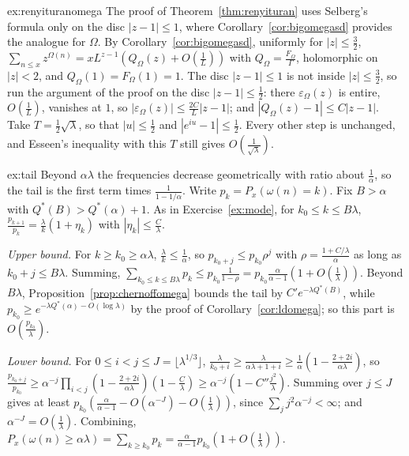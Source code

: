 \begin{solution}{ex:renyituranomega}
\idea The proof of Theorem~\ref{thm:renyituran} uses Selberg's formula only on the disc $|z-1|\le1$, where Corollary~\ref{cor:bigomegasd} provides the analogue for $\Omega$.
\writeup By Corollary~\ref{cor:bigomegasd}, uniformly for $|z|\le\frac32$, $\sum_{n\le x}z^{\Omega(n)}=xL^{z-1}(Q_\Omega(z)+O(\frac1L))$ with $Q_\Omega=\frac{F_\Omega}\Gamma$, holomorphic on $|z|<2$, and $Q_\Omega(1)=F_\Omega(1)=1$. The disc $|z-1|\le1$ is not inside $|z|\le\frac32$, so run the argument of the proof on the disc $|z-1|\le\frac12$: there $\varepsilon_\Omega(z)$ is entire, $O(\frac1L)$, vanishes at $1$, so $|\varepsilon_\Omega(z)|\le\frac{2C}L|z-1|$; and $|Q_\Omega(z)-1|\le C|z-1|$. Take $T=\frac12\sqrt\lambda$, so that $|u|\le\frac12$ and $|e^{iu}-1|\le\frac12$. Every other step is unchanged, and Esseen's inequality with this $T$ still gives $O(\frac1{\sqrt\lambda})$.
\end{solution}

\begin{solution}{ex:tail}
\idea Beyond $\alpha\lambda$ the frequencies decrease geometrically with ratio about $\frac1\alpha$, so the tail is the first term times $\frac1{1-1/\alpha}$.
\writeup Write $p_k=P_x(\omega(n)=k)$. Fix $B>\alpha$ with $Q^*(B)>Q^*(\alpha)+1$. As in Exercise~\ref{ex:mode}, for $k_0\le k\le B\lambda$, $\frac{p_{k+1}}{p_k}=\frac\lambda k(1+\eta_k)$ with $|\eta_k|\le\frac{C}\lambda$.

\emph{Upper bound.} For $k\ge k_0\ge\alpha\lambda$, $\frac\lambda k\le\frac1\alpha$, so $p_{k_0+j}\le p_{k_0}\rho^j$ with $\rho=\frac{1+C/\lambda}\alpha$ as long as $k_0+j\le B\lambda$. Summing, $\sum_{k_0\le k\le B\lambda}p_k\le p_{k_0}\frac1{1-\rho}=p_{k_0}\frac\alpha{\alpha-1}(1+O(\frac1\lambda))$. Beyond $B\lambda$, Proposition~\ref{prop:chernoffomega} bounds the tail by $C'e^{-\lambda Q^*(B)}$, while $p_{k_0}\ge e^{-\lambda Q^*(\alpha)-O(\log\lambda)}$ by the proof of Corollary~\ref{cor:ldomega}; so this part is $O(\frac{p_{k_0}}\lambda)$.

\emph{Lower bound.} For $0\le i<j\le J=\lfloor\lambda^{1/3}\rfloor$, $\frac\lambda{k_0+i}\ge\frac{\lambda}{\alpha\lambda+1+i}\ge\frac1\alpha(1-\frac{2+2i}{\alpha\lambda})$, so $\frac{p_{k_0+j}}{p_{k_0}}\ge\alpha^{-j}\prod_{i<j}(1-\frac{2+2i}{\alpha\lambda})(1-\frac C\lambda)\ge\alpha^{-j}(1-C''\frac{j^2}\lambda)$. Summing over $j\le J$ gives at least $p_{k_0}(\frac\alpha{\alpha-1}-O(\alpha^{-J})-O(\frac1\lambda))$, since $\sum_jj^2\alpha^{-j}<\infty$; and $\alpha^{-J}=O(\frac1\lambda)$. Combining, $P_x(\omega(n)\ge\alpha\lambda)=\sum_{k\ge k_0}p_k=\frac\alpha{\alpha-1}p_{k_0}(1+O(\frac1\lambda))$.
\end{solution}

